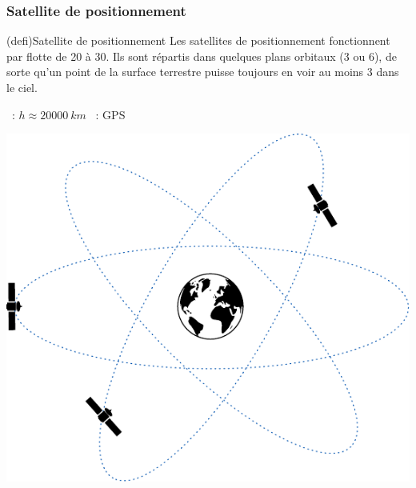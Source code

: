 \documentclass[../../main/main.tex]{subfiles}
\begin{document}
\subsubsection{Satellite de positionnement}
\begin{tcb*}[sidebyside](defi){Satellite de positionnement}
	Les satellites de positionnement fonctionnent par flotte de 20 à 30. Ils sont
	répartis dans quelques plans orbitaux (3 ou 6), de sorte qu'un point de la
	surface terrestre puisse toujours en voir au moins 3 dans le ciel.
	\begin{itemize}
		~: $h \approx \SI{20000}{km}$
		~: GPS
	\end{itemize}
	\tcblower
	\begin{center}
		\includegraphics[width=.6\linewidth]{sat_pos}
	\end{center}
\end{tcb*}
\end{document}
